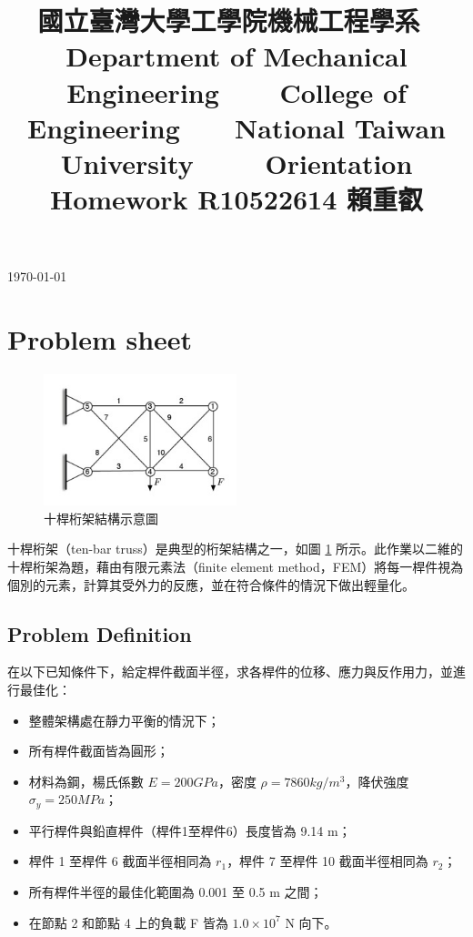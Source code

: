 \documentclass[12pt]{article}
\title{{$~~~$國立臺灣大學工學院機械工程學系
\newline $~~~~$Department of Mechanical Engineering
\newline $~~~~~~~~~$College of Engineering
\newline $~~~~~~~~$National Taiwan University
\newline 
\newline 
\newline $~~~~~~~~~~~$Orientation Homework
\newline 
\newline 
\newline 
\newline R10522614 賴重叡}}
\date{}
\author{}
\numberwithin{figure}{section}
\numberwithin{table}{section}
\numberwithin{equation}{section}
\begin{document}
\begin{CJK}{UTF8}{bkai}

\cfoot{\thepage}


\maketitle
\thispagestyle{empty}
\begin{center}
\vfill
{\large \today}
\end{center}

\newpage
\tableofcontents\thispagestyle{fancy}
\thispagestyle{empty}



\newpage
\setcounter{page}{1}
\section{Problem sheet}

\begin{figure}[H] 
    \centering 
    \includegraphics[width=0.5\textwidth]{1-1.jpg} 
    \caption{十桿桁架結構示意圖} 
    \label{Fig.1-1} 
\end{figure}
十桿桁架（ten-bar truss）是典型的桁架結構之一，如圖 \ref{Fig.1-1} 所示。此作業以二維的十桿桁架為題，藉由有限元素法（finite element method，FEM）將每一桿件視為個別的元素，計算其受外力的反應，並在符合條件的情況下做出輕量化。

\subsection{Problem Definition}
在以下已知條件下，給定桿件截面半徑，求各桿件的位移、應力與反作用力，並進行最佳化：
\begin{itemize}
    \item 整體架構處在靜力平衡的情況下；
    \item 所有桿件截面皆為圓形；
    \item 材料為鋼，楊氏係數 $E = 200 GPa$，密度 $\rho  = 7860 kg/m^3$，降伏強度 $\sigma _y = 250 MPa$；
    \item 平行桿件與鉛直桿件（桿件1至桿件6）長度皆為 9.14 m；
    \item 桿件 1 至桿件 6 截面半徑相同為 $r_1$，桿件 7 至桿件 10 截面半徑相同為 $r_2$；
    \item 所有桿件半徑的最佳化範圍為 0.001 至 0.5 m 之間；
    \item 在節點 2 和節點 4 上的負載 F 皆為 $1.0 × 10^7$ N 向下。
\end{itemize}



\end{CJK}
\end{document}
